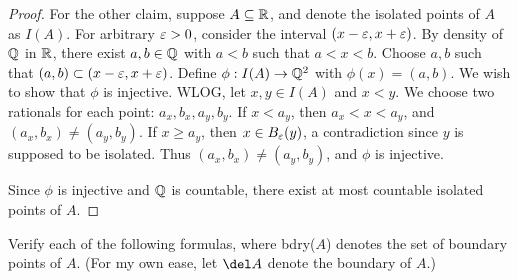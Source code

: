 \documentclass{exam}
\begin{document}
\begin{questions}
\begin{proof}
        For the other claim, suppose $A \subseteq \mathbb {R}$, and denote the isolated points of $A$ as $I(A)$. For arbitrary $\varepsilon > 0$, 
        consider the interval $(x - \varepsilon, x + \varepsilon)$. By density of $\mathbb {Q}$ in $\mathbb {R}$, there exist $a, b\in\mathbb {Q}$ with $a < b$ such that $a < x < b$.
        Choose $a, b$ such that $(a, b) \subset (x - \varepsilon, x + \varepsilon)$. Define $\phi: I(A) \to \mathbb {Q}^2$ with $\phi (x) = (a, b)$. We wish to 
        show that $\phi$ is injective. WLOG, let $x, y\in I(A)$ and $x < y$. We choose two rationals for each point: 
        $a_x, b_x, a_y, b_y$. If $x < a_y$, then $a_x < x < a_y$, and $(a_x, b_x) \neq (a_y, b_y)$. If $x \geq a_y$, then $x\in B_\varepsilon (y)$,
        a contradiction since $y$ is supposed to be isolated. Thus $(a_x, b_x) \neq (a_y, b_y)$, and $\phi$ is injective.

        Since $\phi$ is injective and $\mathbb {Q}$ is countable, there exist at most countable isolated points of $A$.
    \end{proof}


    \newpage
    \question Verify each of the following formulas, where bdry($A$) denotes the set of boundary points of $A$. (For my own ease, let
    $\del A$ denote the boundary of $A$.)
\end{questions}
\end{document}
